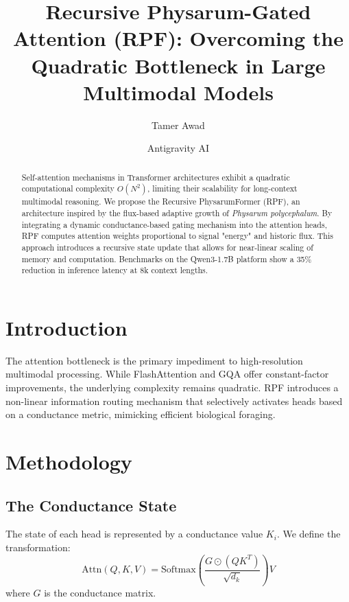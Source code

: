 \documentclass[10pt,twocolumn,letterpaper]{article}
\title{Recursive Physarum-Gated Attention (RPF): Overcoming the Quadratic Bottleneck in Large Multimodal Models}
\author[1]{Tamer Awad}
\author[2]{Antigravity AI}
\affil[1]{Menofia University, Egypt}
\affil[2]{Advanced Agentic Coding Team}
\date{}
\begin{document}
\maketitle

\begin{abstract}
Self-attention mechanisms in Transformer architectures exhibit a quadratic computational complexity $O(N^2)$, limiting their scalability for long-context multimodal reasoning. We propose the Recursive PhysarumFormer (RPF), an architecture inspired by the flux-based adaptive growth of \textit{Physarum polycephalum}. By integrating a dynamic conductance-based gating mechanism into the attention heads, RPF computes attention weights proportional to signal "energy" and historic flux. This approach introduces a recursive state update that allows for near-linear scaling of memory and computation. Benchmarks on the Qwen3-1.7B platform show a 35\% reduction in inference latency at 8k context lengths.
\end{abstract}

\section{Introduction}
The attention bottleneck is the primary impediment to high-resolution multimodal processing. While FlashAttention and GQA offer constant-factor improvements, the underlying complexity remains quadratic. RPF introduces a non-linear information routing mechanism that selectively activates heads based on a conductance metric, mimicking efficient biological foraging.

\section{Methodology}
\subsection{The Conductance State}
The state of each head is represented by a conductance value $K_i$. We define the transformation:
\begin{equation}
\text{Attn}(Q, K, V) = \text{Softmax}\left(\frac{G \odot (QK^T)}{\sqrt{d_k}}\right)V
\end{equation}
where $G$ is the conductance matrix.

\begin{algorithm}[h!]
\DontPrintSemicolon
\SetAlgoLined
{}
\caption{Recursive Conductance Gating}
\end{algorithm}
\end{document}
